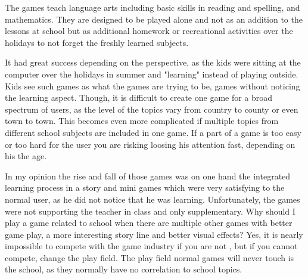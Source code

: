 The games teach language arts including basic skills in reading and spelling, and mathematics.
They are designed to be played alone and not as an addition to the lessons at school but as additional homework or
recreational activities over the holidays to not forget the freshly learned subjects.

It had great success depending on the perspective, as the kids were sitting at the computer over the holidays in summer
and "learning" instead of playing outside. Kids see such games as what the games are trying to be, games without noticing
the learning aspect. Though, it is difficult to create one game for a broad spectrum of users, as the level of the topics
vary from country to county or even town to town. This becomes even more complicated if multiple topics from different
school subjects are included in one game. If a part of a game is too easy or too hard for the user you are risking
loosing his attention fast, depending on his the age.

In my opinion the rise and fall of those games was on one hand the integrated learning process in a story and mini games which
were very satisfying to the normal user, as he did not notice that he was learning.
Unfortunately, the games were not supporting the teacher in class and only supplementary.
Why should I play a game related to school when there are multiple other games with better game play,
a more interesting story line and better visual effects?
Yes, it is nearly impossible to compete with the game industry if you are not , but if you cannot compete, change the play field.
The play field normal games will never touch is the school, as they normally have no correlation to school topics.
